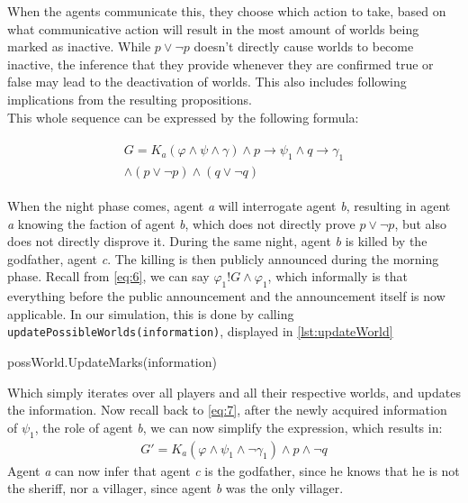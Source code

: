 When the agents communicate this, they choose which action to take, based on
what communicative action will result in the most amount of worlds being marked
as inactive. While $p \lor \neg p$ doesn't directly cause worlds to become
inactive, the inference that they provide whenever they are confirmed true or
false may lead to the deactivation of worlds. This also includes following
implications from the resulting propositions.\\ This whole sequence can be
expressed by the following formula:

\begin{align}
	\begin{split}
		G = K_a(\varphi \land \psi \land\gamma)\land p \rightarrow \psi_1 \land
		q \rightarrow \gamma_1 \\ \land (p \lor \neg p) \land (q \lor \neg q)
		\label{eq:7}
	\end{split}
\end{align}

When the night phase comes, agent \textit{a} will interrogate agent \textit{b},
resulting in agent \textit{a} knowing the faction of agent \textit{b}, which
does not directly prove $p \lor \neg p$, but also does not directly disprove
it. During the same night, agent \textit{b} is killed by the godfather, agent
\textit{c}. The killing is then publicly announced during the morning phase.
Recall from \cref{eq:6}, we can say $\varphi_1!G\land\varphi_1$, which
informally is that everything before the public announcement and the
announcement itself is now applicable. In our simulation, this is done by
calling \lstinline[]{updatePossibleWorlds(information)}, displayed in
\ref{lst:updateWorld}

\begin{algorithm}
	\caption{Snippet from appendix C}
	\begin{algorithmic}[1]
		\State possWorld.UpdateMarks(information)
		\EndFor
		\EndFor
		\EndFunction
	\end{algorithmic}
\end{algorithm}\label{lst:updateWorld}

Which simply iterates over all players and all their respective worlds, and
updates the information. Now recall back to \cref{eq:7}, after the newly
acquired information of $\psi_1$, the role of agent \textit{b}, we can now
simplify the expression, which results in:
\begin{align}
	G' = K_a(\varphi \land \psi_1 \land \neg \gamma_1) \land p \land \neg q
\end{align}
Agent \textit{a} can now infer that agent \textit{c} is the godfather, since he
knows that he is not the sheriff, nor a villager, since agent \textit{b} was
the only villager.
